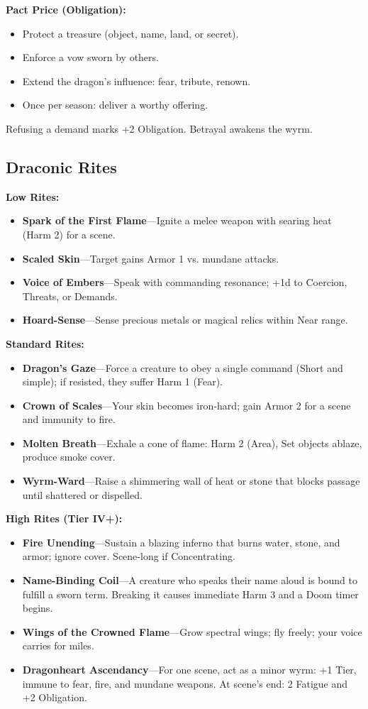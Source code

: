 \documentclass[11pt,letterpaper]{article}
\begin{document}
\textbf{Pact Price (Obligation):}
\begin{itemize}[leftmargin=*]
\item Protect a treasure (object, name, land, or secret).
\item Enforce a vow sworn by others.
\item Extend the dragon's influence: fear, tribute, renown.
\item Once per season: deliver a worthy offering.
\end{itemize}
Refusing a demand marks +2 Obligation. Betrayal awakens the wyrm.

\subsection*{Draconic Rites}

\textbf{Low Rites:}
\begin{itemize}[leftmargin=*]
\item \textbf{Spark of the First Flame}---Ignite a melee weapon with searing heat (Harm 2) for a scene.
\item \textbf{Scaled Skin}---Target gains Armor 1 vs. mundane attacks.
\item \textbf{Voice of Embers}---Speak with commanding resonance; +1d to Coercion, Threats, or Demands.
\item \textbf{Hoard-Sense}---Sense precious metals or magical relics within Near range.
\end{itemize}

\textbf{Standard Rites:}
\begin{itemize}[leftmargin=*]
\item \textbf{Dragon's Gaze}---Force a creature to obey a single command (Short and simple); if resisted, they suffer Harm 1 (Fear).
\item \textbf{Crown of Scales}---Your skin becomes iron-hard; gain Armor 2 for a scene and immunity to fire.
\item \textbf{Molten Breath}---Exhale a cone of flame: Harm 2 (Area), Set objects ablaze, produce smoke cover.
\item \textbf{Wyrm-Ward}---Raise a shimmering wall of heat or stone that blocks passage until shattered or dispelled.
\end{itemize}

\textbf{High Rites (Tier IV+):}
\begin{itemize}[leftmargin=*]
\item \textbf{Fire Unending}---Sustain a blazing inferno that burns water, stone, and armor; ignore cover. Scene-long if Concentrating.
\item \textbf{Name-Binding Coil}---A creature who speaks their name aloud is bound to fulfill a sworn term. Breaking it causes immediate Harm 3 and a Doom timer begins.
\item \textbf{Wings of the Crowned Flame}---Grow spectral wings; fly freely; your voice carries for miles.
\item \textbf{Dragonheart Ascendancy}---For one scene, act as a minor wyrm: +1 Tier, immune to fear, fire, and mundane weapons. At scene's end: 2 Fatigue and +2 Obligation.
\end{itemize}
\end{document}
